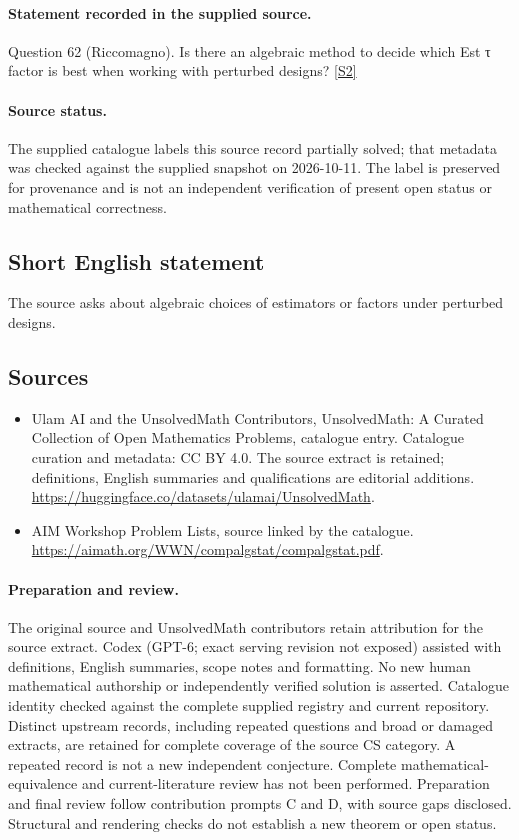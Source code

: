 \documentclass[11pt]{article}
\begin{document}
\paragraph{Statement recorded in the supplied source.}
Question 62 (Riccomagno). Is there an algebraic method to decide which Est τ factor is best when working with perturbed designs? \href{https://aimath.org/WWN/compalgstat/compalgstat.pdf}{[S2]}
\paragraph{Source status.}
The supplied catalogue labels this source record partially solved; that metadata was checked against the supplied snapshot on 2026-10-11. The label is preserved for provenance and is not an independent verification of present open status or mathematical correctness.
\subsection{Short English statement}
The source asks about algebraic choices of estimators or factors under perturbed designs.
\subsection{Sources}
\begin{itemize}
\item[S1] Ulam AI and the UnsolvedMath Contributors, UnsolvedMath: A Curated Collection of Open Mathematics Problems, catalogue entry. Catalogue curation and metadata: CC BY 4.0. The source extract is retained; definitions, English summaries and qualifications are editorial additions.
\url{https://huggingface.co/datasets/ulamai/UnsolvedMath}.
\item[S2] AIM Workshop Problem Lists, source linked by the catalogue.
\url{https://aimath.org/WWN/compalgstat/compalgstat.pdf}.
\end{itemize}
\paragraph{Preparation and review.}
The original source and UnsolvedMath contributors retain attribution for the source extract. Codex (GPT-6; exact serving revision not exposed) assisted with definitions, English summaries, scope notes and formatting. No new human mathematical authorship or independently verified solution is asserted. Catalogue identity checked against the complete supplied registry and current repository. Distinct upstream records, including repeated questions and broad or damaged extracts, are retained for complete coverage of the source CS category. A repeated record is not a new independent conjecture. Complete mathematical-equivalence and current-literature review has not been performed. Preparation and final review follow contribution prompts C and D, with source gaps disclosed. Structural and rendering checks do not establish a new theorem or open status.
\label{end:statement}
\end{document}
